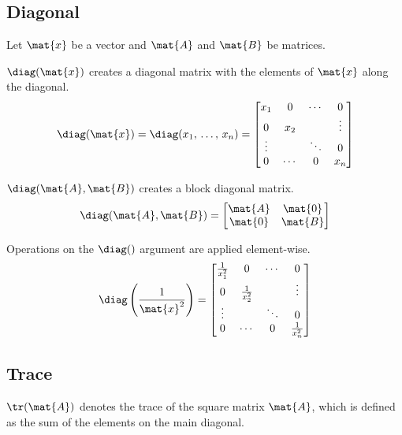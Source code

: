 \subsection{Diagonal}

Let $\mat{x}$ be a vector and $\mat{A}$ and $\mat{B}$ be matrices.

$\diag(\mat{x})$ creates a diagonal matrix with the elements of $\mat{x}$ along
the diagonal.
\begin{equation*}
  \diag(\mat{x}) = \diag(x_1,\, \ldots,\, x_n) =
  \begin{bmatrix}
    x_1 & 0 & \cdots & 0 \\
    0 & x_2 & & \vdots \\
    \vdots & & \ddots & 0 \\
    0 & \cdots & 0 & x_n
  \end{bmatrix}
\end{equation*}

$\diag(\mat{A}, \mat{B})$ creates a block diagonal matrix.
\begin{equation*}
  \diag(\mat{A}, \mat{B}) =
  \begin{bmatrix}
    \mat{A} & \mat{0} \\
    \mat{0} & \mat{B}
  \end{bmatrix}
\end{equation*}

Operations on the $\diag()$ argument are applied element-wise.
\begin{equation*}
  \diag\left(\frac{1}{\mat{x}^2}\right) =
  \begin{bmatrix}
    \frac{1}{x_1^2} & 0 & \cdots & 0 \\
    0 & \frac{1}{x_2^2} & & \vdots \\
    \vdots & & \ddots & 0 \\
    0 & \cdots & 0 & \frac{1}{x_n^2}
  \end{bmatrix}
\end{equation*}

\subsection{Trace}

$\tr(\mat{A})$ denotes the trace of the square matrix $\mat{A}$, which is
defined as the sum of the elements on the main diagonal.
